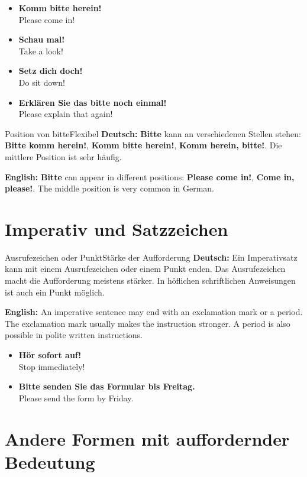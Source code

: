 \documentclass[a4paper,11pt]{article}
\newcommand{\GermanText}[1]{\textbf{Deutsch: }#1\par}
\newcommand{\EnglishText}[1]{{\small\color{SoftGray}\textbf{English: }#1\par}}
\newcommand{\ExampleItem}[2]{\item \textbf{#1}\\{\small\color{SoftGray}#2}}
\begin{document}
        \begin{exbox}
            \begin{itemize}
                \ExampleItem{Komm bitte herein!}{Please come in!}
                \ExampleItem{Schau mal!}{Take a look!}
                \ExampleItem{Setz dich doch!}{Do sit down!}
                \ExampleItem{Erklären Sie das bitte noch einmal!}{Please explain that again!}
            \end{itemize}
        \end{exbox}

        \begin{grammarentry}{Position von bitte}{Flexibel}
            \GermanText{\textbf{Bitte} kann an verschiedenen Stellen stehen: \textbf{Bitte komm herein!}, \textbf{Komm bitte herein!}, \textbf{Komm herein, bitte!}. Die mittlere Position ist sehr häufig.}
            \EnglishText{\textbf{Bitte} can appear in different positions: \textbf{Please come in!}, \textbf{Come in, please!}. The middle position is very common in German.}
        \end{grammarentry}

    \section{Imperativ und Satzzeichen}

        \begin{grammarentry}{Ausrufezeichen oder Punkt}{Stärke der Aufforderung}
            \GermanText{Ein Imperativsatz kann mit einem Ausrufezeichen oder einem Punkt enden. Das Ausrufezeichen macht die Aufforderung meistens stärker. In höflichen schriftlichen Anweisungen ist auch ein Punkt möglich.}
            \EnglishText{An imperative sentence may end with an exclamation mark or a period. The exclamation mark usually makes the instruction stronger. A period is also possible in polite written instructions.}
        \end{grammarentry}

        \begin{exbox}
            \begin{itemize}
                \ExampleItem{Hör sofort auf!}{Stop immediately!}
                \ExampleItem{Bitte senden Sie das Formular bis Freitag.}{Please send the form by Friday.}
            \end{itemize}
        \end{exbox}

    \section{Andere Formen mit auffordernder Bedeutung}
\end{document}
